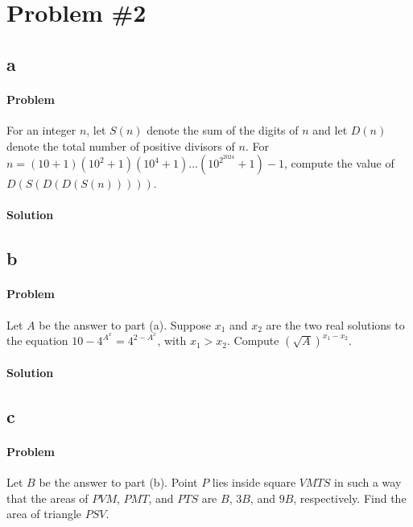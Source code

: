 \documentclass[10pt]{article}
\theoremstyle{plain}
\theoremstyle{definition}
\theoremstyle{remark}
\begin{document}
\section{Problem \#2} 

\subsection{a}

\paragraph{Problem} For an integer \(n\), let \(S(n)\) denote the sum of the digits of \(n\) and let \(D(n)\) denote the total number of positive divisors of \(n\). For \(n=(10+1)(10^2+1)(10^4+1)...(10^{2^{2024}}+1)-1\), compute the value of \(D(S(D(D(S(n)))))\). 

\paragraph{Solution} 

\subsection{b}

\paragraph{Problem} Let \(A\) be the answer to part (a). Suppose \(x_1\) and \(x_2\) are the two real solutions to the equation \(10-4^{A^x}=4^{2-A^x}\), with \(x_1>x_2\). Compute \(\left(\sqrt{A}\right)^{x_1-x_2}\).

\paragraph{Solution} 

\subsection{c}

\paragraph{Problem} Let \(B\) be the answer to part (b). Point \(P\) lies inside square \(VMTS\) in such a way that the areas of \(PVM\), \(PMT\), and \(PTS\) are \(B\), \(3B\), and \(9B\), respectively. Find the area of triangle \(PSV\).
\end{document}

